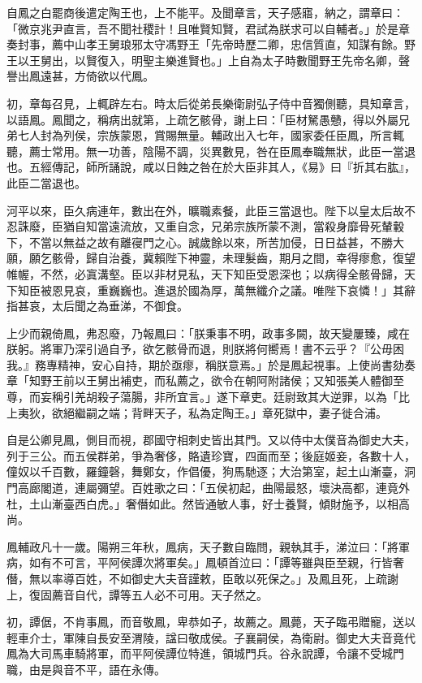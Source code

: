 \begin{pinyinscope}
自鳳之白罷商後遣定陶王也，上不能平。及聞章言，天子感寤，納之，謂章曰：「微京兆尹直言，吾不聞社稷計！且唯賢知賢，君試為朕求可以自輔者。」於是章奏封事，薦中山孝王舅琅邪太守馮野王「先帝時歷二卿，忠信質直，知謀有餘。野王以王舅出，以賢復入，明聖主樂進賢也。」上自為太子時數聞野王先帝名卿，聲譽出鳳遠甚，方倚欲以代鳳。

初，章每召見，上輒辟左右。時太后從弟長樂衛尉弘子侍中音獨側聽，具知章言，以語鳳。鳳聞之，稱病出就第，上疏乞骸骨，謝上曰：「臣材駑愚戇，得以外屬兄弟七人封為列侯，宗族蒙恩，賞賜無量。輔政出入七年，國家委任臣鳳，所言輒聽，薦士常用。無一功善，陰陽不調，災異數見，咎在臣鳳奉職無狀，此臣一當退也。五經傳記，師所誦說，咸以日蝕之咎在於大臣非其人，《易》曰『折其右肱』，此臣二當退也。

河平以來，臣久病連年，數出在外，曠職素餐，此臣三當退也。陛下以皇太后故不忍誅廢，臣猶自知當遠流放，又重自念，兄弟宗族所蒙不測，當殺身靡骨死輦轂下，不當以無益之故有離寑門之心。誠歲餘以來，所苦加侵，日日益甚，不勝大願，願乞骸骨，歸自治養，冀賴陛下神靈，未理髮齒，期月之間，幸得瘳愈，復望帷幄，不然，必寘溝壑。臣以非材見私，天下知臣受恩深也；以病得全骸骨歸，天下知臣被恩見哀，重巍巍也。進退於國為厚，萬無纖介之議。唯陛下哀憐！」其辭指甚哀，太后聞之為垂涕，不御食。

上少而親倚鳳，弗忍廢，乃報鳳曰：「朕秉事不明，政事多闕，故天變屢臻，咸在朕躬。將軍乃深引過自予，欲乞骸骨而退，則朕將何嚮焉！書不云乎？『公毋困我。』務專精神，安心自持，期於亟瘳，稱朕意焉。」於是鳳起視事。上使尚書劾奏章「知野王前以王舅出補吏，而私薦之，欲令在朝阿附諸侯；又知張美人體御至尊，而妄稱引羌胡殺子蕩腸，非所宜言。」遂下章吏。廷尉致其大逆罪，以為「比上夷狄，欲絕繼嗣之端；背畔天子，私為定陶王。」章死獄中，妻子徙合浦。

自是公卿見鳳，側目而視，郡國守相刺史皆出其門。又以侍中太僕音為御史大夫，列于三公。而五侯群弟，爭為奢侈，賂遺珍寶，四面而至；後庭姬妾，各數十人，僮奴以千百數，羅鐘磬，舞鄭女，作倡優，狗馬馳逐；大治第室，起土山漸臺，洞門高廊閣道，連屬彌望。百姓歌之曰：「五侯初起，曲陽最怒，壞決高都，連竟外杜，土山漸臺西白虎。」奢僭如此。然皆通敏人事，好士養賢，傾財施予，以相高尚。

鳳輔政凡十一歲。陽朔三年秋，鳳病，天子數自臨問，親執其手，涕泣曰：「將軍病，如有不可言，平阿侯譚次將軍矣。」鳳頓首泣曰：「譚等雖與臣至親，行皆奢僭，無以率導百姓，不如御史大夫音謹敕，臣敢以死保之。」及鳳且死，上疏謝上，復固薦音自代，譚等五人必不可用。天子然之。

初，譚倨，不肯事鳳，而音敬鳳，卑恭如子，故薦之。鳳薨，天子臨弔贈寵，送以輕車介士，軍陳自長安至渭陵，諡曰敬成侯。子襄嗣侯，為衛尉。御史大夫音竟代鳳為大司馬車騎將軍，而平阿侯譚位特進，領城門兵。谷永說譚，令讓不受城門職，由是與音不平，語在永傳。


\end{pinyinscope}
